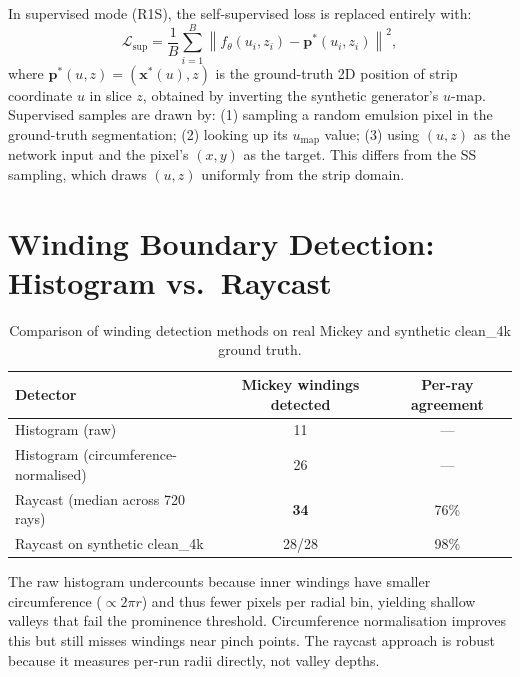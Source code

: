 \documentclass[11pt,a4paper]{article}
\newcommand{\norm}[1]{\left\lVert #1 \right\rVert}
\begin{document}
In supervised mode (R1S), the self-supervised loss is replaced entirely with:
\begin{equation}
    \mathcal{L}_{\text{sup}} = \frac{1}{B}\sum_{i=1}^{B} \norm{f_\theta(u_i, z_i) - \bm{p}^*(u_i, z_i)}^2,
\end{equation}
where $\bm{p}^*(u, z) = (\bm{x}^*(u), z)$ is the ground-truth 2D position of strip coordinate $u$ in slice $z$, obtained by inverting the synthetic generator's $u$-map. Supervised samples are drawn by: (1) sampling a random emulsion pixel in the ground-truth segmentation; (2) looking up its $u_{\text{map}}$ value; (3) using $(u, z)$ as the network input and the pixel's $(x, y)$ as the target. This differs from the SS sampling, which draws $(u, z)$ uniformly from the strip domain.

\section{Winding Boundary Detection: Histogram vs.\ Raycast}
\label{app:detectors}

\begin{table}[H]
\centering
\begin{tabular}{lcc}
\toprule
Detector & Mickey windings detected & Per-ray agreement \\
\midrule
Histogram (raw) & 11 & --- \\
Histogram (circumference-normalised) & 26 & --- \\
Raycast (median across 720 rays) & \textbf{34} & 76\% \\
Raycast on synthetic clean\_4k & 28/28 & 98\% \\
\bottomrule
\end{tabular}
\caption{Comparison of winding detection methods on real Mickey and synthetic clean\_4k ground truth.}
\end{table}

The raw histogram undercounts because inner windings have smaller circumference ($\propto 2\pi r$) and thus fewer pixels per radial bin, yielding shallow valleys that fail the prominence threshold. Circumference normalisation improves this but still misses windings near pinch points. The raycast approach is robust because it measures per-run radii directly, not valley depths.
\end{document}
